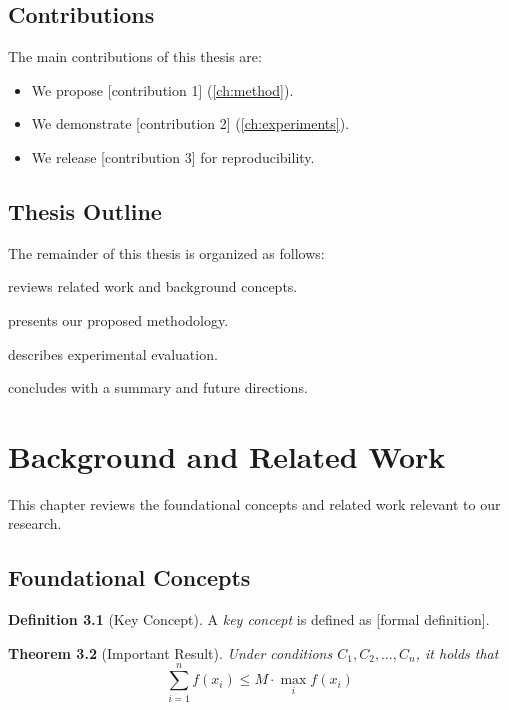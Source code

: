 \documentclass[12pt,a4paper,oneside]{book}
\theoremstyle{plain}
\newtheorem{theorem}{Theorem}[chapter]
\theoremstyle{definition}
\newtheorem{definition}[theorem]{Definition}
\theoremstyle{remark}
\begin{document}
\section{Contributions}

The main contributions of this thesis are:
\begin{itemize}[itemsep=0.5em]
    \item We propose [contribution 1] (\cref{ch:method}).
    \item We demonstrate [contribution 2] (\cref{ch:experiments}).
    \item We release [contribution 3] for reproducibility.
\end{itemize}

\section{Thesis Outline}

The remainder of this thesis is organized as follows:
\begin{description}[itemsep=0.3em]
    \item[\Cref{ch:background}] reviews related work and background concepts.
    \item[\Cref{ch:method}] presents our proposed methodology.
    \item[\Cref{ch:experiments}] describes experimental evaluation.
    \item[\Cref{ch:conclusion}] concludes with a summary and future directions.
\end{description}

\chapter{Background and Related Work}
\label{ch:background}

This chapter reviews the foundational concepts and related work relevant to our research.

\section{Foundational Concepts}

\begin{definition}[Key Concept]
\label{def:concept}
A \emph{key concept} is defined as [formal definition].
\end{definition}

\begin{theorem}[Important Result]
\label{thm:result}
Under conditions $C_1, C_2, \ldots, C_n$, it holds that
\begin{equation}
    \label{eq:theorem}
    \sum_{i=1}^{n} f(x_i) \leq M \cdot \max_{i} f(x_i)
\end{equation}
\end{theorem}
\end{document}
